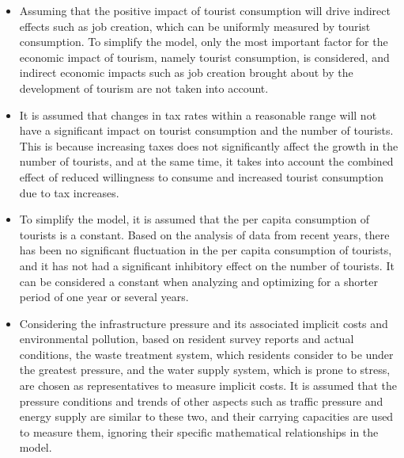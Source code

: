 \documentclass[12pt]{article}  %
\begin{document}
\begin{itemize}
	\item Assuming that the positive impact of tourist consumption will drive indirect effects such as job creation, which can be uniformly measured by tourist consumption. To simplify the model, only the most important factor for the economic impact of tourism, namely tourist consumption, is considered, and indirect economic impacts such as job creation brought about by the development of tourism are not taken into account.
	\item It is assumed that changes in tax rates within a reasonable range will not have a significant impact on tourist consumption and the number of tourists. This is because increasing taxes does not significantly affect the growth in the number of tourists, and at the same time, it takes into account the combined effect of reduced willingness to consume and increased tourist consumption due to tax increases.
	\item To simplify the model, it is assumed that the per capita consumption of tourists is a constant. Based on the analysis of data from recent years,\cite{4} there has been no significant fluctuation in the per capita consumption of tourists, and it has not had a significant inhibitory effect on the number of tourists. It can be considered a constant when analyzing and optimizing for a shorter period of one year or several years.
	\item Considering the infrastructure pressure and its associated implicit costs and environmental pollution, based on resident survey reports and actual conditions,\cite{5} the waste treatment system, which residents consider to be under the greatest pressure, and the water supply system, which is prone to stress, are chosen as representatives to measure implicit costs. It is assumed that the pressure conditions and trends of other aspects such as traffic pressure and energy supply are similar to these two, and their carrying capacities are used to measure them, ignoring their specific mathematical relationships in the model.

\end{itemize}
\end{document}
